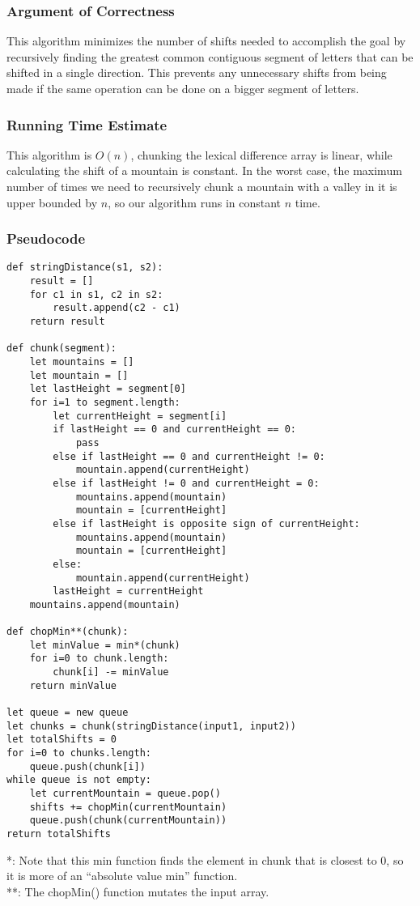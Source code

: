 \documentclass[letterpaper, 12pt]{math}
\begin{document}
\subsubsection*{Argument of Correctness}
This algorithm minimizes the number of shifts needed to accomplish the goal by
recursively finding the greatest common contiguous segment of letters that can
be shifted in a single direction. This prevents any unnecessary shifts from
being made if the same operation can be done on a bigger segment of letters.

\subsubsection*{Running Time Estimate}
This algorithm is \( O(n) \), chunking the lexical difference array is linear,
while calculating the shift of a mountain is constant. In the worst case, the
maximum number of times we need to recursively chunk a mountain with a valley
in it is upper bounded by \( n \), so our algorithm runs in constant \( n \)
time.

\subsubsection*{Pseudocode}
\begin{lstlisting}
def stringDistance(s1, s2):
    result = []
    for c1 in s1, c2 in s2:
        result.append(c2 - c1)
    return result

def chunk(segment):
    let mountains = []
    let mountain = []
    let lastHeight = segment[0]
    for i=1 to segment.length:
        let currentHeight = segment[i]
        if lastHeight == 0 and currentHeight == 0:
            pass
        else if lastHeight == 0 and currentHeight != 0:
            mountain.append(currentHeight)
        else if lastHeight != 0 and currentHeight = 0:
            mountains.append(mountain)
            mountain = [currentHeight]
        else if lastHeight is opposite sign of currentHeight:
            mountains.append(mountain)
            mountain = [currentHeight]
        else:
            mountain.append(currentHeight)
        lastHeight = currentHeight
    mountains.append(mountain)

def chopMin**(chunk):
    let minValue = min*(chunk)
    for i=0 to chunk.length:
        chunk[i] -= minValue
    return minValue

let queue = new queue
let chunks = chunk(stringDistance(input1, input2))
let totalShifts = 0
for i=0 to chunks.length:
    queue.push(chunk[i])
while queue is not empty:
    let currentMountain = queue.pop()
    shifts += chopMin(currentMountain)
    queue.push(chunk(currentMountain))
return totalShifts
\end{lstlisting}
*: Note that this min function finds the element in chunk that is closest to 0,
so it is more of an ``absolute value min'' function. \\
**: The chopMin() function mutates the input array. \\
\end{document}
